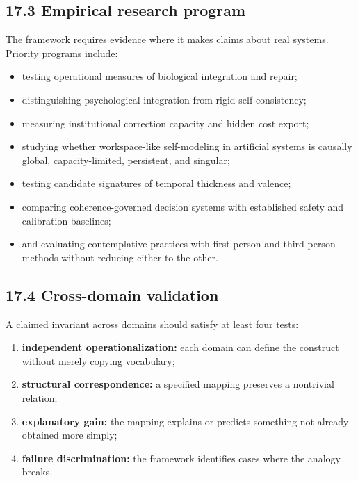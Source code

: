 \documentclass[
  11pt,
]{article}
\providecommand{\tightlist}{%
  \setlength{\itemsep}{0pt}\setlength{\parskip}{0pt}}
\begin{document}
\subsection{17.3 Empirical research
program}\label{empirical-research-program}

The framework requires evidence where it makes claims about real
systems. Priority programs include:

\begin{itemize}
\tightlist
\item
  testing operational measures of biological integration and repair;
\item
  distinguishing psychological integration from rigid self-consistency;
\item
  measuring institutional correction capacity and hidden cost export;
\item
  studying whether workspace-like self-modeling in artificial systems is
  causally global, capacity-limited, persistent, and singular;
\item
  testing candidate signatures of temporal thickness and valence;
\item
  comparing coherence-governed decision systems with established safety
  and calibration baselines;
\item
  and evaluating contemplative practices with first-person and
  third-person methods without reducing either to the other.
\end{itemize}

\subsection{17.4 Cross-domain validation}\label{cross-domain-validation}

A claimed invariant across domains should satisfy at least four tests:

\begin{enumerate}
\def\labelenumi{\arabic{enumi}.}
\tightlist
\item
  \textbf{independent operationalization:} each domain can define the
  construct without merely copying vocabulary;
\item
  \textbf{structural correspondence:} a specified mapping preserves a
  nontrivial relation;
\item
  \textbf{explanatory gain:} the mapping explains or predicts something
  not already obtained more simply;
\item
  \textbf{failure discrimination:} the framework identifies cases where
  the analogy breaks.
\end{enumerate}
\end{document}
